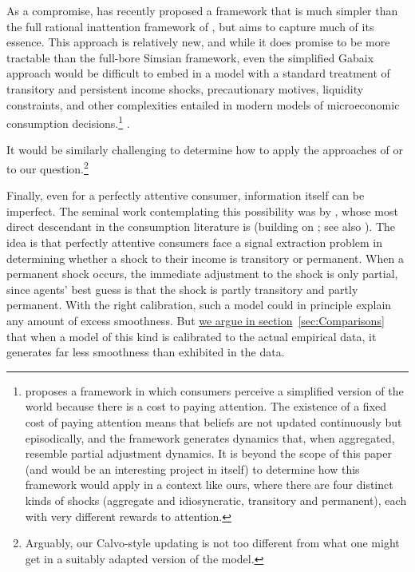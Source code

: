\documentclass[titlepage]{./econtex}
\begin{document}
As a compromise, %
\cite{gabaixSparsityQJE} has recently proposed a framework that is much simpler than the full rational inattention framework of \cite{simsInattention}, but aims to capture much of its essence.  This approach is relatively new, and while it does promise to be more tractable than the full-bore Simsian framework, even the simplified Gabaix approach would be difficult to embed in a model with a standard treatment of transitory and persistent income shocks, precautionary motives, liquidity constraints, and other complexities entailed in modern models of microeconomic consumption decisions.\footnote{\cite{gabaixSparsityQJE} proposes a framework in which consumers perceive a simplified version of the world because there is a cost to paying attention.  The existence of a fixed cost of paying attention means that beliefs are not updated continuously but episodically, and the framework generates dynamics that, when aggregated, resemble partial adjustment dynamics.  It is beyond the scope of this paper (and would be an interesting project in itself) to determine how this framework would apply in a context like ours, where there are four distinct kinds of shocks (aggregate and idiosyncratic, transitory and permanent), each with very different rewards to attention.}
 .

 It would be similarly challenging to determine how to apply the approaches of \cite{woodfordImperfect} or \cite{msInertiaAER} to our question.\footnote{Arguably, our Calvo-style updating is not too different from what one might get in a suitably adapted version of the \cite{msInertiaAER} model.}

Finally, even for a perfectly attentive consumer, information itself can be imperfect.  The seminal work contemplating this possibility was by \cite{muthOptimal}, whose most direct descendant in the consumption literature is \cite{pischkeMicroMacro} (building on \cite{lucas:imperfectInfo}; see also \cite{ludvigson&michaelides:excesses}).  The idea is that perfectly attentive consumers face a signal extraction problem in determining whether a shock to their income is transitory or permanent.  When a permanent shock occurs, the immediate adjustment to the shock is only partial, since agents' best guess is that the shock is partly transitory and partly permanent.   With the right calibration, such a model could in principle explain any amount of excess smoothness.  But \hyperlink{MuthLucasPischke}{we argue in section}~\ref{sec:Comparisons} that when a model of this kind is calibrated to the actual empirical data, it generates far less smoothness than exhibited in the data.
\end{document}
